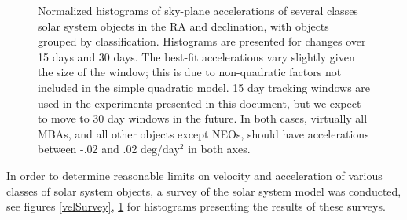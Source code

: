 \begin{figure}[ht!]
  \caption{Normalized histograms of sky-plane accelerations of several
    classes solar system objects in the RA and declination, with
    objects grouped by classification.  Histograms are presented for
    changes over 15 days and 30 days. The best-fit accelerations vary
    slightly given the size of the window; this is due to
    non-quadratic factors not included in the simple quadratic model.
    15 day tracking windows are used in the experiments presented in
    this document, but we expect to move to 30 day windows in the
    future.  In both cases, virtually all MBAs, and all other objects
    except NEOs, should have accelerations between -.02 and .02
    deg/day$^2$ in both axes.}
  \label{accSurvey}
\end{figure}


In order to determine reasonable limits on velocity and acceleration
of various classes of solar system objects, a survey of the solar
system model \citep{Grav2011} was conducted, see figures
\ref{velSurvey}, \ref{accSurvey} for histograms
presenting the results of these surveys.

